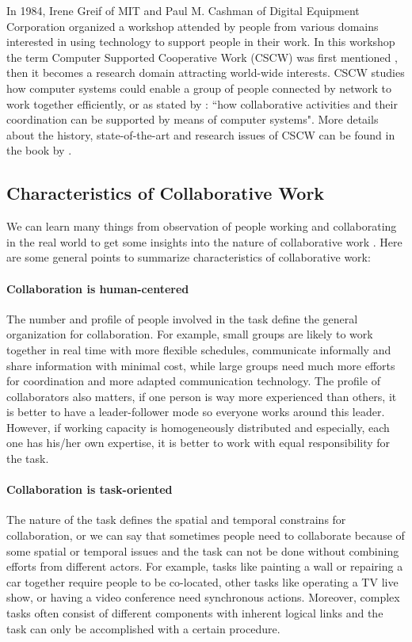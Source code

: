 In 1984, Irene Greif of MIT and Paul M. Cashman of Digital Equipment Corporation organized a workshop attended by people from various domains interested in using technology to support people in their work. In this workshop the term Computer Supported Cooperative Work (CSCW) was first mentioned \citep{Grudin1994Computer}, then it becomes a research domain attracting world-wide interests. CSCW studies how computer systems could enable a group of people connected by network to work together efficiently, or as stated by \citet{Carstensen1999CSCW}: ``how collaborative activities and their coordination can be supported by means of computer systems". More details about the history, state-of-the-art and research issues of CSCW can be found in the book by \citet{Beaudouin1999CSCW}.


\subsection{Characteristics of Collaborative Work}
We can learn many things from observation of people working and collaborating in the real world to get some insights into the nature of collaborative work \citep{Churchill1998CVE}. Here are some general points to summarize characteristics of collaborative work:

\paragraph{Collaboration is human-centered} The number and profile of people involved in the task define the general organization for collaboration. For example, small groups are likely to work together in real time with more flexible schedules, communicate informally and share information with minimal cost, while large groups need much more efforts for coordination and more adapted communication technology. The profile of collaborators also matters, if one person is way more experienced than others, it is better to have a leader-follower mode so everyone works around this leader. However, if working capacity is homogeneously distributed and especially, each one has his/her own expertise, it is better to work with equal responsibility for the task.

\paragraph{Collaboration is task-oriented} The nature of the task defines the spatial and temporal constrains for collaboration, or we can say that sometimes people need to collaborate because of some spatial or temporal issues and the task can not be done without combining efforts from different actors. For example, tasks like painting a wall or repairing a car together require people to be co-located, other tasks like operating a TV live show, or having a video conference need synchronous actions. Moreover, complex tasks often consist of different components with inherent logical links and the task can only be accomplished with a certain procedure.

